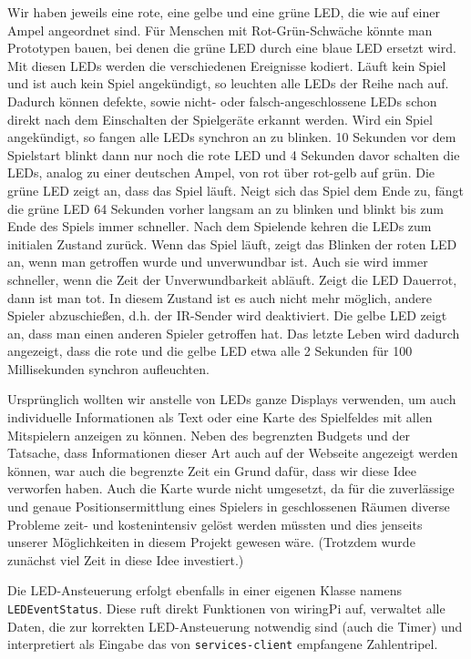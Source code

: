 Wir haben jeweils eine rote, eine gelbe und eine grüne LED, die wie auf einer Ampel angeordnet sind.
Für Menschen mit Rot-Grün-Schwäche könnte man Prototypen bauen, bei denen die grüne LED durch eine
blaue LED ersetzt wird.
Mit diesen LEDs werden die verschiedenen Ereignisse kodiert.
Läuft kein Spiel und ist auch kein Spiel angekündigt, so leuchten alle LEDs der Reihe nach auf.
Dadurch können defekte, sowie nicht- oder falsch-angeschlossene LEDs schon direkt nach dem
Einschalten der Spielgeräte erkannt werden.
Wird ein Spiel angekündigt, so fangen alle LEDs synchron an zu blinken.
10 Sekunden vor dem Spielstart blinkt dann nur noch die rote LED und 4 Sekunden davor schalten die
LEDs, analog zu einer deutschen Ampel, von rot über rot-gelb auf grün.
Die grüne LED zeigt an, dass das Spiel läuft.
Neigt sich das Spiel dem Ende zu, fängt die grüne LED 64 Sekunden vorher langsam an zu blinken und
blinkt bis zum Ende des Spiels immer schneller.
Nach dem Spielende kehren die LEDs zum initialen Zustand zurück.
Wenn das Spiel läuft, zeigt das Blinken der roten LED an, wenn man getroffen wurde und unverwundbar
ist.
Auch sie wird immer schneller, wenn die Zeit der Unverwundbarkeit abläuft.
Zeigt die LED Dauerrot, dann ist man tot.
In diesem Zustand ist es auch nicht mehr möglich, andere Spieler abzuschießen, d.h. der IR-Sender
wird deaktiviert.
Die gelbe LED zeigt an, dass man einen anderen Spieler getroffen hat.
Das letzte Leben wird dadurch angezeigt, dass die rote und die gelbe LED etwa alle 2 Sekunden für
100 Millisekunden synchron aufleuchten.

Ursprünglich wollten wir anstelle von LEDs ganze Displays verwenden, um auch individuelle
Informationen als Text oder eine Karte des Spielfeldes mit allen Mitspielern anzeigen zu können.
Neben des begrenzten Budgets und der Tatsache, dass Informationen dieser Art auch auf der Webseite
angezeigt werden können, war auch die begrenzte Zeit ein Grund dafür, dass wir diese Idee verworfen
haben.
Auch die Karte wurde nicht umgesetzt, da für die zuverlässige und genaue Positionsermittlung eines
Spielers in geschlossenen Räumen diverse Probleme zeit- und kostenintensiv gelöst werden müssten und
dies jenseits unserer Möglichkeiten in diesem Projekt gewesen wäre.
(Trotzdem wurde zunächst viel Zeit in diese Idee investiert.)

Die LED-Ansteuerung erfolgt ebenfalls in einer eigenen Klasse namens \texttt{LEDEventStatus}.
Diese ruft direkt Funktionen von wiringPi auf, verwaltet alle Daten, die zur korrekten
LED-Ansteuerung notwendig sind (auch die Timer) und interpretiert als Eingabe das von
\texttt{services-client} empfangene Zahlentripel.

